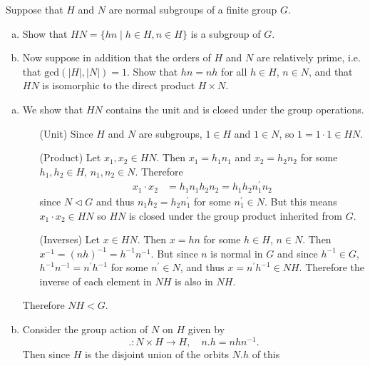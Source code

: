 \documentclass{article}
\newcounter{Problem}
\newenvironment{Problem}{\begin{Exercise}[name={Problem},
                                          counter={Problem}]}
                        {\end{Exercise}}
\begin{document}
\pagebreak

\begin{Problem}
Suppose that $H$ and $N$ are normal subgroups of a finite group $G$.
\begin{enumerate}[(a)]
  \item{Show that $HN = \{ hn \mid h \in H, n \in H \}$
        is a subgroup of $G$.}
  \item{Now suppose in addition that the orders of $H$ and $N$ are
      relatively prime, i.e. that $\mathrm{gcd}(|H|,|N|) = 1$. Show
      that $hn = nh$ for all $h \in H$, $n \in N$, and that $HN$ is
      isomorphic to the direct product $H \times N$.}
\end{enumerate}
\end{Problem}

\begin{Answer}
\begin{enumerate}[(a)]
  \item{We show that $HN$ contains the unit and is closed under the
      group operations.
  \begin{itemize}
    \item[(Unit)]
    {
      Since $H$ and $N$ are subgroups, $1 \in H$ and $1 \in N$, so
      $1 = 1 \cdot 1 \in HN$.
    }
    \item[(Product)]
    {
      Let $x_1, x_2 \in HN$. Then $x_1 = h_1 n_1$ and $x_2 = h_2 n_2$
      for some $h_1, h_2 \in H$, $n_1, n_2 \in N$. Therefore
      \begin{align*}
        x_1 \cdot x_2 &= h_1 n_1 h_2 n_2 = h_1 h_2 n_1^\prime n_2
      \end{align*}
      since $N \triangleleft G$ and thus $n_1 h_2 = h_2 n_1^\prime$
      for some $n_1^\prime \in N$. But this means $x_1 \cdot x_2 \in HN$ so
      $HN$ is closed under the group product inherited from $G$.
    }
    \item[(Inverses)]
    {
      Let $x \in HN$. Then $x = hn$ for some $h \in H$, $n \in N$.
      Then $x^{-1} = (nh)^{-1} = h^{-1} n^{-1}$. But since $n$ is
      normal in $G$ and since $h^{-1} \in G$, $h^{-1} n^{-1} =
      n^\prime h^{-1}$ for some $n^\prime \in N$, and thus
      $x = n^\prime h^{-1} \in NH$. Therefore the inverse of each
      element in $NH$ is also in $NH$.
    }
  \end{itemize}
  Therefore $NH < G$.
  }
  \item
  {
    Consider the group action of $N$ on $H$ given by
    $$
    . : N \times H \to H, \quad
    n . h = n h n^{-1}.
    $$
    Then since $H$ is the disjoint union of the orbits $N . h$ of this
}
\end{enumerate}
\end{Answer}
\end{document}
